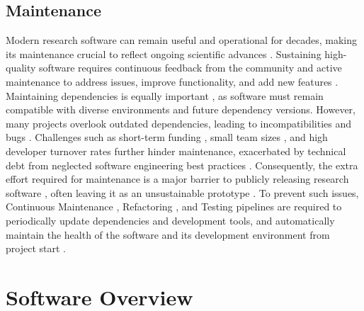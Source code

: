\documentclass{article}
\begin{document}
\subsection{Maintenance}

Modern research software can remain useful and operational for decades, making its maintenance crucial to reflect ongoing scientific advances \cite{SoftwareSustainabilityInstitute, SoftEngForCompSci, SoftDevEnvForSciSoft}. Sustaining high-quality software requires continuous feedback from the community and active maintenance to address issues, improve functionality, and add new features \cite{BarelySufficientPracticesInSciComp, SoftwareSustainabilityInstitute}. Maintaining dependencies is equally important \cite{EmpComparisonOfDepNetEvolution, FortyYearsOfSoftwareReuse}, as software must remain compatible with diverse environments and future dependency versions. However, many projects overlook outdated dependencies, leading to incompatibilities and bugs \cite{DoDevsUpdateDeps, MeasuringDepFreshness, ThouShaltNotDepend, OnImpactOfSecVulnInDepNet}. Challenges such as short-term funding \cite{ManagingChaos, BetterSoftwareBetterResearch}, small team sizes \cite{SoftEngForCompSci, HowScientistsReallyUseComputers}, and high developer turnover rates \cite{RecommendOnResearchSoftware, EmpStudyDesignInHPC} further hinder maintenance, exacerbated by technical debt from neglected software engineering best practices \cite{BetterSoftwareBetterResearch, ProblemsOfEndUserDevs, SoftEngForCompSci, ManagingTechnicalDebt, 10SimpleRulesForOpenDevOfSciSoft, SoftDesignForEmpoweringSci, ManagingChaos, SoftwareSustainabilityInstitute}. Consequently, the extra effort required for maintenance is a major barrier to publicly releasing research software \cite{BetterSoftwareBetterResearch, PublishYourCode}, often leaving it as an unsustainable prototype \cite{SustainableResearchSoftwareHandOver, 10RuleForSoftwareInCompBio, PublishYourCode}. To prevent such issues, Continuous Maintenance \cite{ContinuousMaintenance}, Refactoring \cite{ContRefact}, and Testing \cite{ContinuousSoftEng} pipelines are required to periodically update dependencies and development tools, and automatically maintain the health of the software and its development environment from project start \cite{SoftEngForCompSci}.

\section{Software Overview}
\label{section-overview}
\end{document}
